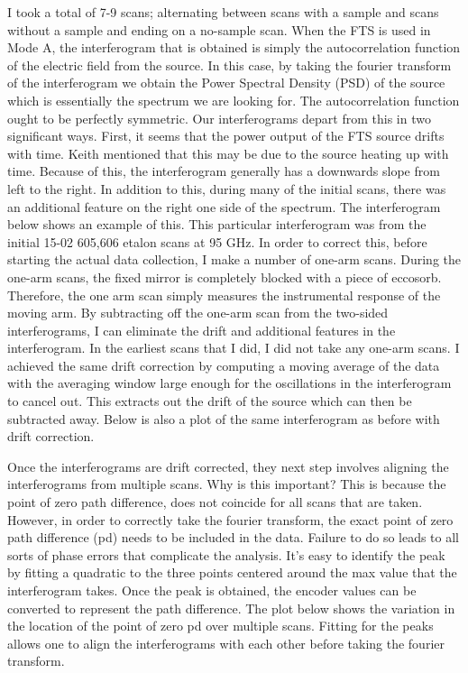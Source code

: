 \documentclass[12pt]{article}
\begin{document}
I took a total of 7-9 scans; alternating between scans with a sample and scans without a sample and ending on a no-sample scan. When the FTS is used in Mode A, the interferogram that is obtained is simply the autocorrelation function of the electric field from the source. In this case, by taking the fourier transform of the interferogram we obtain the Power Spectral Density (PSD) of the source which is essentially the spectrum we are looking for. The autocorrelation function ought to be perfectly symmetric. Our interferograms depart from this in two significant ways. First, it seems that the power output of the FTS source drifts with time. Keith mentioned that this may be due to the source heating up with time. Because of this, the interferogram generally has a downwards slope from left to the right. In addition to this, during many of the initial scans, there was an additional feature on the right one side of the spectrum. The interferogram below shows an example of this. This particular interferogram was from the initial 15-02 605,606 etalon scans at 95 GHz. In order to correct this, before starting the actual data collection, I make a number of one-arm scans. During the one-arm scans, the fixed mirror is completely blocked with a piece of eccosorb. Therefore, the one arm scan simply measures the instrumental response of the moving arm. By subtracting off the one-arm scan from the two-sided interferograms, I can eliminate the drift and additional features in the interferogram. In the earliest scans that I did, I did not take any one-arm scans. I achieved the same drift correction by computing a moving average of the data with the averaging window large enough for the oscillations in the interferogram to cancel out. This extracts out the drift of the source which can then be subtracted away. Below is also a plot of the same interferogram as before with drift correction.

Once the interferograms are drift corrected, they next step involves aligning the interferograms from multiple scans. Why is this important? This is because the point of zero path difference, does not coincide for all scans that are taken. However, in order to correctly take the fourier transform, the exact point of zero path difference (pd) needs to be included in the data. Failure to do so leads to all sorts of phase errors that complicate the analysis. It's easy to identify the peak by fitting a quadratic to the three points centered around the max value that the interferogram takes. Once the peak is obtained, the encoder values can be converted to represent the path difference. The plot below shows the variation in the location of the point of zero pd over multiple scans. Fitting for the peaks allows one to align the interferograms with each other before taking the fourier transform.
\end{document}
